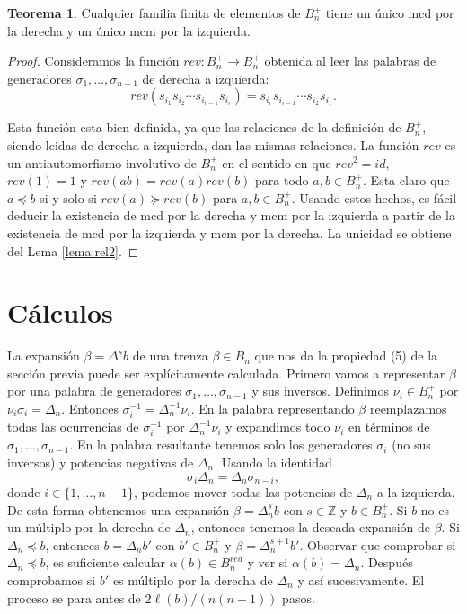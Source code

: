 \documentclass[12pt]{book}
\theoremstyle{definition}
\newtheorem{teor}{Teorema}[section]
\begin{document}
\begin{teor}
Cualquier familia finita de elementos de $B_n^+$ tiene un único mcd por la derecha y un único mcm por la izquierda.
\end{teor}
\begin{proof} Consideramos la función $rev: B_n^+\rightarrow B_n^+$ obtenida al leer las palabras de generadores $\sigma_1,\ldots, \sigma_{n-1}$ de derecha a izquierda:
$$rev(s_{i_1}s_{i_2}\cdots s_{i_{r-1}}s_{i_r})=s_{i_r}s_{i_{r-1}}\cdots s_{i_{2}}s_{i_1}.$$

Esta función esta bien definida, ya que las relaciones de la definición de $B_n^+$, siendo leidas de derecha a izquierda, dan las mismas relaciones. La función $rev$ es un antiautomorfismo involutivo de $B_n^+$ en el sentido en que $rev^2=id$, $rev(1)=1$ y $rev(ab)=rev(a)rev(b)$ para todo $a,b\in B_n^+$. Esta claro que $a\preceq b$ si y solo si $rev(a)\succeq rev(b)$ para $a,b\in B_n^+$. Usando estos hechos, es fácil deducir la existencia de mcd por la derecha y mcm por la izquierda a partir de la existencia de mcd por la izquierda y mcm por la derecha. La unicidad se obtiene del Lema \ref{lema:rel2}.
\end{proof}

\section{Cálculos}

La expansión $\beta=\Delta^sb$ de una trenza $\beta\in B_n$ que nos da la propiedad (5) de la sección previa puede ser explícitamente calculada. Primero vamos a representar $\beta$ por una palabra de generadores $\sigma_1,\ldots,\sigma_{n-1}$ y sus inversos. Definimos $\nu_i\in B_n^+$ por $\nu_i\sigma_i=\Delta_n$. Entonces $\sigma_i^{-1}=\Delta_n^{-1}\nu_i$. En la palabra representando $\beta$ reemplazamos todas las ocurrencias de $\sigma_i^{-1}$ por $\Delta_n^{-1}\nu_i$ y expandimos todo $\nu_i$ en términos de $\sigma_1,\ldots,\sigma_{n-1}$. En la palabra resultante tenemos solo los generadores $\sigma_i$ (no sus inversos) y potencias negativas de $\Delta_n$. Usando la identidad
\begin{equation}
\sigma_i\Delta_n=\Delta_n\sigma_{n-i},
\end{equation}
donde $i\in\{1,\ldots,n-1\}$, podemos mover todas las potencias de $\Delta_n$ a la izquierda. De esta forma obtenemos una expansión $\beta=\Delta_n^sb$ con $s\in\mathbb{Z}$ y $b\in B_n^+$. Si $b$ no es un múltiplo por la derecha de $\Delta_n$, entonces tenemos la deseada expansión de $\beta$. Si $\Delta_n\preceq b$, entonces $b=\Delta_n b'$ con $b'\in B_n^+$ y $\beta=\Delta_n^{s+1}b'$. Observar que comprobar si $\Delta_n\preceq b$, es suficiente calcular $\alpha(b)\in B_n^{red}$ y ver si $\alpha(b)=\Delta_n$. Después comprobamos si $b'$ es múltiplo por la derecha de $\Delta_n$ y así sucesivamente. El proceso se para antes de $2\ell(b)/(n(n-1))$ pasos.
\end{document}
